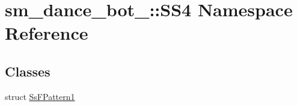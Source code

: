 \hypertarget{namespacesm__dance__bot__3_1_1SS4}{}\section{sm\+\_\+dance\+\_\+bot\+\_\+:\+:S\+S4 Namespace Reference}
\label{namespacesm__dance__bot__3_1_1SS4}
\subsection*{Classes}
\begin{DoxyCompactItemize}
\item 
struct \hyperlink{structsm__dance__bot__3_1_1SS4_1_1SsFPattern1}{Ss\+F\+Pattern1}
\end{DoxyCompactItemize}
